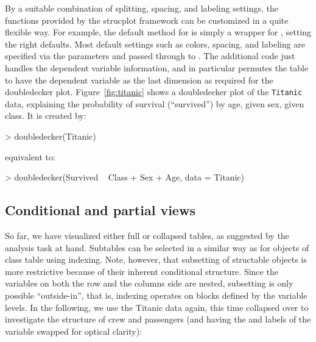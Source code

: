 \documentclass{Z}
\newcommand{\data}[1]{\texttt{#1}}
\newcommand{\class}[1]{\textsf{#1}}
\newcommand{\codefun}[1]{\code{#1()}}
\begin{document}
By a suitable combination of splitting, spacing, and
labeling settings, the functions provided by the strucplot framework
can be customized in a quite flexible way. For example, 
the default method for \codefun{doubledecker} is simply a wrapper for 
\codefun{strucplot}, setting the right defaults.
Most default settings such as colors, spacing, and labeling are
specified via the parameters and passed through to
\codefun{strucplot}. The additional code just handles the dependent
variable information, and in particular permutes the table to have the dependent
variable as the last dimension as required for the doubledecker plot.
Figure~\ref{fig:titanic} shows a doubledecker plot of
the \data{Titanic} data, explaining the probability of survival (``survived'') by age, given
sex, given class. It is created by:

\begin{Schunk}
\begin{Sinput}
> doubledecker(Titanic)
\end{Sinput}
\end{Schunk}

\noindent equivalent to:

\begin{Schunk}
\begin{Sinput}
> doubledecker(Survived ~ Class + Sex + Age, data = Titanic)
\end{Sinput}
\end{Schunk}

\subsection{Conditional and partial views}


So far, we have visualized either full or collapsed tables, as
suggested by the analysis task at hand. Subtables can be selected in a
similar way as for objects of class \class{table} using
indexing. Note, however, that subsetting of \class{structable} objects 
is more restrictive because of their inherent conditional structure. Since the variables
on both the row and the columns side are nested, 
subsetting is only possible ``outside-in'', that is, indexing operates
on blocks defined by the variable levels. In the following, we use the
Titanic data again, this time collapsed over  to investigate the
structure of crew and passengers (and having the  and
 labels of the  variable swapped for optical clarity):
\end{document}
